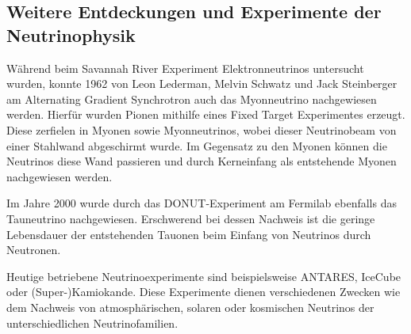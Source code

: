\subsection{Weitere Entdeckungen und Experimente der Neutrinophysik}
Während beim Savannah River Experiment Elektronneutrinos untersucht wurden, konnte 1962 von Leon Lederman, Melvin Schwatz und Jack Steinberger am Alternating Gradient Synchrotron auch das Myonneutrino nachgewiesen werden.
Hierfür wurden Pionen mithilfe eines Fixed Target Experimentes erzeugt.
Diese zerfielen in Myonen sowie Myonneutrinos, wobei dieser Neutrinobeam von einer Stahlwand abgeschirmt wurde.
Im Gegensatz zu den Myonen können die Neutrinos diese Wand passieren und durch Kerneinfang als entstehende Myonen nachgewiesen werden.

Im Jahre 2000 wurde durch das DONUT-Experiment am Fermilab ebenfalls das Tauneutrino nachgewiesen.
Erschwerend bei dessen Nachweis ist die geringe Lebensdauer der entstehenden Tauonen beim Einfang von Neutrinos durch Neutronen.

Heutige betriebene Neutrinoexperimente sind beispielsweise ANTARES, IceCube oder (Super-)Kamiokande.
Diese Experimente dienen verschiedenen Zwecken wie dem Nachweis von atmosphärischen, solaren oder kosmischen Neutrinos der unterschiedlichen Neutrinofamilien.